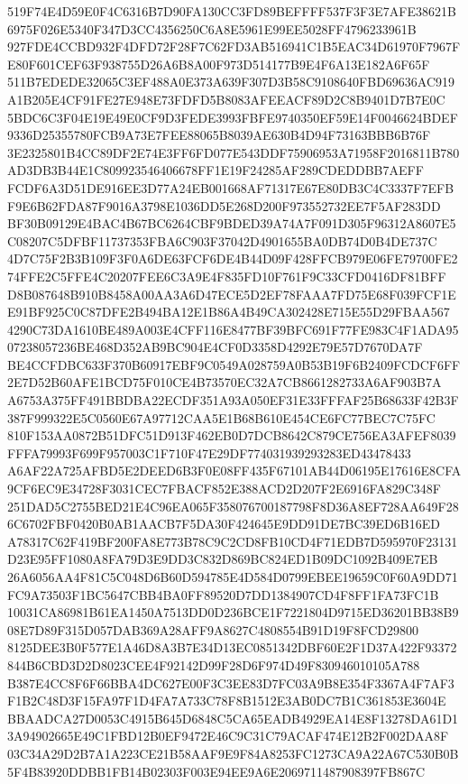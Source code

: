 \documentclass[UTF8,fontset=fandol,zihao=-4,a4paper]{ctexart}
\begin{document}
{{519F74E4D59E0F4C6316B7D90FA130CC3FD89BEFFFF537F3F3E7AFE38621B6975F026E5340F347D3CC4356250C6A8E5961E99EE5028FF4796233961B
927FDE4CCBD932F4DFD72F28F7C62FD3AB516941C1B5EAC34D61970F7967FE80F601CEF63F938755D26A6B8A00F973D514177B9E4F6A13E182A6F65F
511B7EDEDE32065C3EF488A0E373A639F307D3B58C9108640FBD69636AC919A1B205E4CF91FE27E948E73FDFD5B8083AFEEACF89D2C8B9401D7B7E0C
5BDC6C3F04E19E49E0CF9D3FEDE3993FBFE9740350EF59E14F0046624BDEF9336D25355780FCB9A73E7FEE88065B8039AE630B4D94F73163BBB6B76F
3E2325801B4CC89DF2E74E3FF6FD077E543DDF75906953A71958F2016811B780AD3DB3B44E1C809923546406678FF1E19F24285AF289CDEDDBB7AEFF
FCDF6A3D51DE916EE3D77A24EB001668AF71317E67E80DB3C4C3337F7EFBF9E6B62FDA87F9016A3798E1036DD5E268D200F973552732EE7F5AF283DD
BF30B09129E4BAC4B67BC6264CBF9BDED39A74A7F091D305F96312A8607E5C08207C5DFBF11737353FBA6C903F37042D4901655BA0DB74D0B4DE737C
4D7C75F2B3B109F3F0A6DE63FCF6DE4B44D09F428FFCB979E06FE79700FE274FFE2C5FFE4C20207FEE6C3A9E4F835FD10F761F9C33CFD0416DF81BFF
D8B087648B910B8458A00AA3A6D47ECE5D2EF78FAAA7FD75E68F039FCF1EE91BF925C0C87DFE2B494BA12E1B86A4B49CA302428E715E55D29FBAA567
4290C73DA1610BE489A003E4CFF116E8477BF39BFC691F77FE983C4F1ADA9507238057236BE468D352AB9BC904E4CF0D3358D4292E79E57D7670DA7F
BE4CCFDBC633F370B60917EBF9C0549A028759A0B53B19F6B2409FCDCF6FF2E7D52B60AFE1BCD75F010CE4B73570EC32A7CB8661282733A6AF903B7A
A6753A375FF491BBDBA22ECDF351A93A050EF31E33FFFAF25B68633F42B3F387F999322E5C0560E67A97712CAA5E1B68B610E454CE6FC77BEC7C75FC
810F153AA0872B51DFC51D913F462EB0D7DCB8642C879CE756EA3AFEF8039FFFA79993F699F957003C1F710F47E29DF774031939293283ED43478433
A6AF22A725AFBD5E2DEED6B3F0E08FF435F67101AB44D06195E17616E8CFA9CF6EC9E34728F3031CEC7FBACF852E388ACD2D207F2E6916FA829C348F
251DAD5C2755BED21E4C96EA065F358076700187798F8D36A8EF728AA649F286C6702FBF0420B0AB1AACB7F5DA30F424645E9DD91DE7BC39ED6B16ED
A78317C62F419BF200FA8E773B78C9C2CD8FB10CD4F71EDB7D595970F23131D23E95FF1080A8FA79D3E9DD3C832D869BC824ED1B09DC1092B409E7EB
26A6056AA4F81C5C048D6B60D594785E4D584D0799EBEE19659C0F60A9DD71FC9A73503F1BC5647CBB4BA0FF89520D7DD1384907CD4F8FF1FA73FC1B
10031CA86981B61EA1450A7513DD0D236BCE1F7221804D9715ED36201BB38B908E7D89F315D057DAB369A28AFF9A8627C4808554B91D19F8FCD29800
8125DEE3B0F577E1A46D8A3B7E34D13EC0851342DBF60E2F1D37A422F93372844B6CBD3D2D8023CEE4F92142D99F28D6F974D49F830946010105A788
B387E4CC8F6F66BBA4DC627E00F3C3EE83D7FC03A9B8E354F3367A4F7AF3F1B2C48D3F15FA97F1D4FA7A733C78F8B1512E3AB0DC7B1C361853E3604E
BBAADCA27D0053C4915B645D6848C5CA65EADB4929EA14E8F13278DA61D13A94902665E49C1FBD12B0EF9472E46C9C31C79ACAF474E12B2F002DAA8F
03C34A29D2B7A1A223CE21B58AAF9E9F84A8253FC1273CA9A22A67C530B0B5F4B83920DDBB1FB14B02303F003E94EE9A6E2069711487908397FB867C
}}
\end{document}
